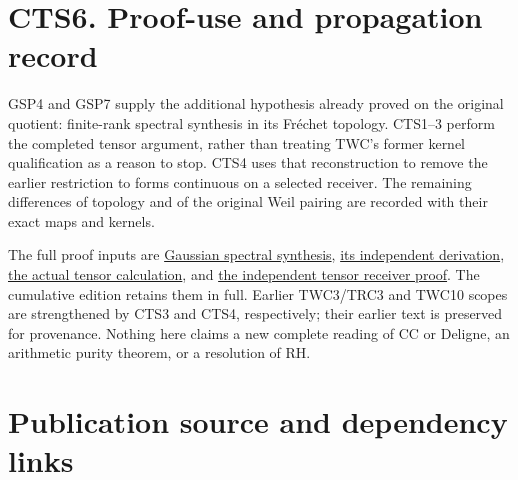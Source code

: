 \section{CTS6. Proof-use and propagation
record}\label{cts6.-proof-use-and-propagation-record}

GSP4 and GSP7 supply the additional hypothesis already proved on the
original quotient: finite-rank spectral synthesis in its Fréchet
topology. CTS1--3 perform the completed tensor argument, rather than
treating TWC's former kernel qualification as a reason to stop. CTS4
uses that reconstruction to remove the earlier restriction to forms
continuous on a selected receiver. The remaining differences of topology
and of the original Weil pairing are recorded with their exact maps and
kernels.

The full proof inputs are
\href{https://github.com/KokunoYumeto/zeta-function-research-reader/blob/main/workbenches/splitzero-tandem/continuations/20260925-full-source-tensor-and-original-divisor/gct/GAUSSIAN_SPECTRAL_SYNTHESIS.md}{Gaussian
spectral synthesis},
\href{https://github.com/KokunoYumeto/zeta-function-research-reader/blob/main/workbenches/splitzero-tandem/continuations/20260925-full-source-tensor-and-original-divisor/gct/GAUSSIAN_SPECTRAL_SYNTHESIS_INDEPENDENT.md}{its
independent derivation},
\href{https://github.com/KokunoYumeto/zeta-function-research-reader/blob/main/workbenches/splitzero-tandem/continuations/20260925-full-source-tensor-and-original-divisor/gct/ACTUAL_SPECIALIZATION_TENSOR_WEIGHT_COMPARISON.md}{the
actual tensor calculation}, and
\href{https://github.com/KokunoYumeto/zeta-function-research-reader/blob/main/workbenches/splitzero-tandem/continuations/20260925-full-source-tensor-and-original-divisor/gct/TENSOR_RECEIVER_INDEPENDENT_CHECK.md}{the
independent tensor receiver proof}. The cumulative edition retains them
in full. Earlier TWC3/TRC3 and TWC10 scopes are strengthened by CTS3 and
CTS4, respectively; their earlier text is preserved for provenance.
Nothing here claims a new complete reading of CC or Deligne, an
arithmetic purity theorem, or a resolution of RH.

\section{Publication source and dependency
links}\label{publication-source-and-dependency-links-11}

